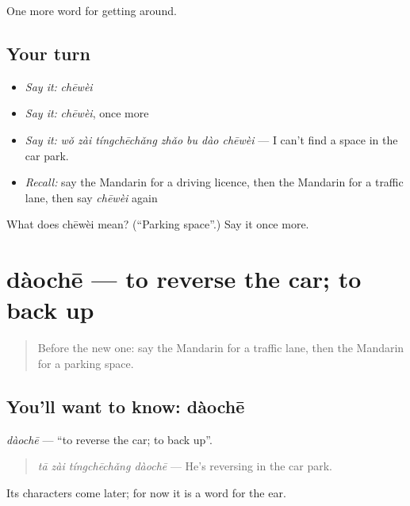 \begin{grammarlens}[title={What you've built}]
One more word for getting around.
\end{grammarlens}

\subsection*{Your turn}
\begin{itemize}
\raggedright
  \item \emph{Say it:} \emph{chēwèi}
  \item \emph{Say it:} \emph{chēwèi}, once more
  \item \emph{Say it:} \emph{wǒ zài tíngchēchǎng zhǎo bu dào chēwèi} — I can't find a space in the car park.
  \item \emph{Recall:} say the Mandarin for a driving licence, then the Mandarin for a traffic lane, then say \emph{chēwèi} again
\end{itemize}

\begin{tcolorbox}[breakable,colback=teal!4,colframe=teal!35!black,title={Before you move on}]
What does chēwèi mean? (\textquotedblleft{}Parking space\textquotedblright{}.) Say it once more.
\end{tcolorbox}
\section[dàochē]{dàochē — to reverse the car; to back up}

\label{lesson:ZH-C420-daoche}



\begin{quote}
Before the new one: say the Mandarin for a traffic lane, then the Mandarin for a parking space.
\end{quote}

\subsection*{You'll want to know: dàochē}
\emph{dàochē} — \textquotedblleft{}to reverse the car; to back up\textquotedblright{}.

\begin{quote}
\emph{tā zài tíngchēchǎng dàochē} — He's reversing in the car park.
\end{quote}

Its characters come later; for now it is a word for the ear.

